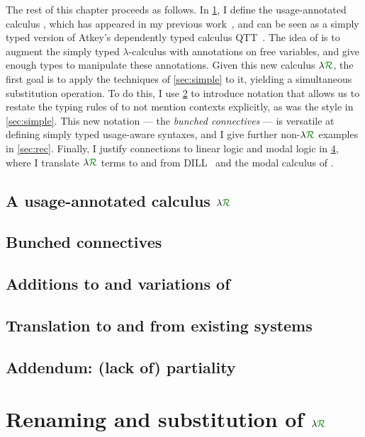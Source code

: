 The rest of this chapter proceeds as follows.
In \cref{sec:lr}, I define the usage-annotated calculus \name{}, which has
appeared in my previous work~\citep{WA21}, and can be seen as a
simply typed version of Atkey's dependently typed calculus QTT~\citep{Atkey18}.
The idea of \name{} is to augment the simply typed $\lambda$-calculus with
annotations on free variables, and give enough types to manipulate these
annotations.
Given this new calculus $\name$, the first goal is to apply the techniques of
\cref{sec:simple} to it, yielding a simultaneous substitution operation.
To do this, I use \cref{sec:lnd} to introduce notation that allows us to restate
the typing rules of \name{} to not mention contexts explicitly, as was the style
in \cref{sec:simple}.
This new notation --- the \emph{bunched connectives} --- is versatile at
defining simply typed usage-aware syntaxes, and I give further non-$\name$
examples in \cref{sec:rec}.
Finally, I justify connections to linear logic and modal logic in
\cref{sec:translation}, where I translate $\name$ terms to and from
DILL~\citep{Barber1996} and the modal calculus of \citet{judgmental}.

\section{A usage-annotated calculus $\name$}\label{sec:lr}

\section{Bunched connectives}\label{sec:lnd}

\section{Additions to and variations of \name{}}\label{sec:variant}

\section{Translation to and from existing systems}\label{sec:translation}

\section{Addendum: (lack of) partiality}\label{sec:part}



\chapter{Renaming and substitution of $\name$}\label{sec:ren-sub-lr}

